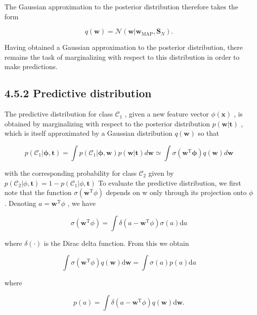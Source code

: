 \documentclass[
  10
]{article}
\begin{document}
The Gaussian approximation to the posterior distribution therefore takes
the form

\[
q (\mathbf {w}) = \mathcal {N} (\mathbf {w} | \mathbf {w} _ {\mathrm{MAP}}, \mathbf {S} _ {N}).\tag{4.144}
\]

Having obtained a Gaussian approximation to the posterior distribution,
there remains the task of marginalizing with respect to this
distribution in order to make predictions.

\subsection{4.5.2 Predictive
distribution}\label{predictive-distribution}

The predictive distribution for class \(\mathcal { C } _ { 1 }\) , given
a new feature vector \(\phi ( \mathbf { x } )\) , is obtained by
marginalizing with respect to the posterior distribution
\(p ( \mathbf { w } | \mathbf { t } )\) , which is itself approximated
by a Gaussian distribution \(q ( \mathbf { w } )\) so that

\[
p (\mathcal {C} _ {1} | \boldsymbol {\phi}, \mathbf {t}) = \int p (\mathcal {C} _ {1} | \boldsymbol {\phi}, \mathbf {w}) p (\mathbf {w} | \mathbf {t}) d \mathbf {w} \simeq \int \sigma (\mathbf {w} ^ {\mathrm{T}} \boldsymbol {\phi}) q (\mathbf {w}) d \mathbf {w}\tag{4.145}
\]

with the corresponding probability for class \(\mathcal { C } _ { 2 }\)
given by
\(p ( \mathcal { C } _ { 2 } | \phi , \mathbf { t } ) = 1 - p ( \mathcal { C } _ { 1 } | \phi , \mathbf { t } )\)
To evaluate the predictive distribution, we first note that the function
\(\sigma ( \mathbf { w } ^ { \mathrm { T } } \phi )\) depends on w only
through its projection onto \(\phi\) . Denoting
\(a = \mathbf { w } ^ { \mathrm { T } } \phi\) , we have

\[
\sigma (\mathbf {w} ^ {\mathrm{T}} \phi) = \int \delta (a - \mathbf {w} ^ {\mathrm{T}} \phi) \sigma (a) \mathrm{d} a\tag{4.146}
\]

where \(\delta ( \cdot )\) is the Dirac delta function. From this we
obtain

\[
\int \sigma (\mathbf {w} ^ {\mathrm{T}} \phi) q (\mathbf {w}) \mathrm{d} \mathbf {w} = \int \sigma (a) p (a) \mathrm{d} a\tag{4.147}
\]

where

\[
p (a) = \int \delta (a - \mathbf {w} ^ {\mathrm{T}} \phi) q (\mathbf {w}) \mathrm{d} \mathbf {w}.\tag{4.148}
\]
\end{document}
